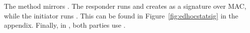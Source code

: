 The \mStatSig{} method mirrors \mSigStat{}.
%
The responder runs \mSig{} and creates \mAuthr{} as a signature over MAC, 
while the initiator runs \mStat{}.
%
This can be found in Figure~\ref{fig:edhocstatsig} in the appendix.
%
Finally, in \mStatStat{}, both parties use \mStat.
%
%
%
% 
%
%
%
